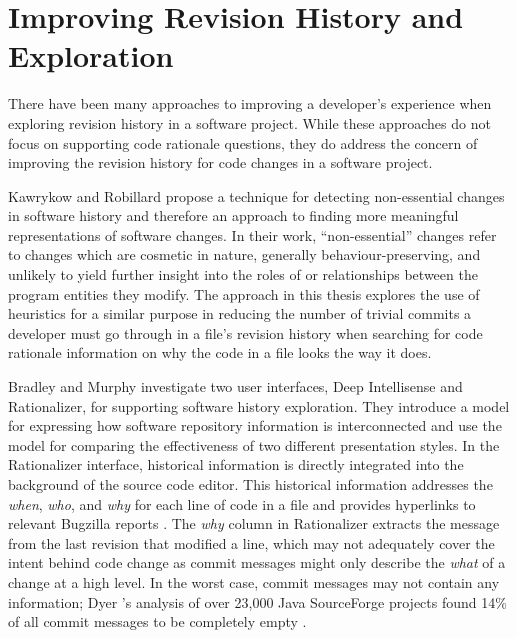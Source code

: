 \section{Improving Revision History and Exploration}

There have been many approaches to improving a developer's experience when exploring revision history in a software project. While these approaches do not focus on supporting code rationale questions, they do address the concern of improving the revision history for code changes in a software project.

Kawrykow and Robillard \cite{kawrykow_non-essential_2011} propose a technique for detecting non-essential changes in software history and therefore an approach to finding more meaningful representations of software changes.
In their work, ``non-essential'' changes refer to changes which are cosmetic in nature, generally behaviour-preserving, and unlikely to yield further insight into the roles of or relationships between the program entities they modify. 
The approach in this thesis explores the use of heuristics for a similar purpose in reducing the number of trivial commits a developer must go through in a file's revision history when searching for code rationale information on why the code in a file looks the way it does.

Bradley and Murphy \cite{bradley_supporting_2011} investigate two user interfaces, Deep Intellisense and Rationalizer, for supporting software history exploration.
They introduce a model for expressing how software repository information is interconnected and use the model for comparing the effectiveness of two different presentation styles.
In the Rationalizer interface, historical information is directly integrated into the background of the source code editor.
This historical information addresses the \emph{when}, \emph{who}, and \emph{why} for each line of code in a file and provides hyperlinks to relevant Bugzilla reports \cite{bradley_supporting_2011}.
The \emph{why} column in Rationalizer extracts the message from the last revision that modified a line, which may not adequately cover the intent behind code change as commit messages might only describe the \emph{what} of a change at a high level.
In the worst case, commit messages may not contain any information; Dyer \etal's analysis of over 23,000 Java SourceForge projects found 14\% of all commit messages to be completely empty \cite{dyer_boa_2013}.

